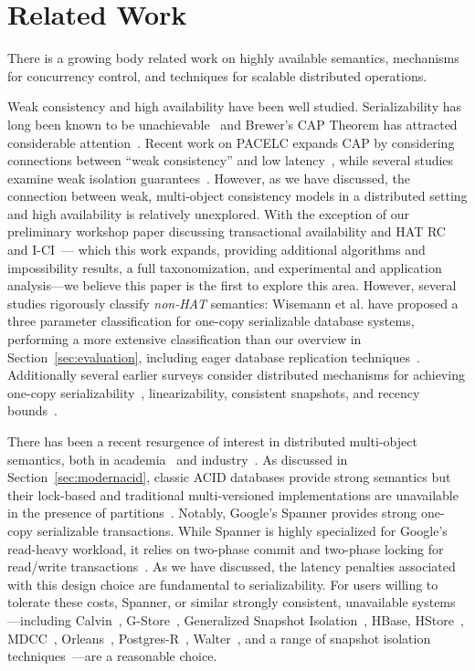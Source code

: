 
\section{Related Work}

There is a growing body related work on highly available semantics,
mechanisms for concurrency control, and techniques for scalable
distributed operations.

Weak consistency and high availability have been well
studied. Serializability has long been known to be
unachievable~\cite{davidson-survey} and Brewer's CAP Theorem has
attracted considerable attention~\cite{gilbert-cap}. Recent work on
PACELC expands CAP by considering connections between ``weak
consistency'' and low latency~\cite{abadi-pacelc}, while several
studies examine weak isolation guarantees~\cite{adya,
  ansicritique}. However, as we have discussed, the connection between
weak, multi-object consistency models in a distributed setting and
high availability is relatively unexplored. With the exception of our
preliminary workshop paper discussing transactional availability and
HAT RC and I-CI~\cite{hat-hotos}--- which this work expands, providing
additional algorithms and impossibility results, a full
taxonomization, and experimental and application analysis---we believe
this paper is the first to explore this area. However, several studies
rigorously classify \textit{non-HAT} semantics: Wisemann et al. have
proposed a three parameter classification for one-copy serializable
database systems, performing a more extensive classification than our
overview in Section~\ref{sec:evaluation}, including eager database
replication techniques~\cite{kemme-classification}. Additionally
several earlier surveys consider distributed mechanisms for achieving
one-copy serializability~\cite{wisemann-survey}, linearizability,
consistent snapshots, and recency bounds~\cite{ceri-mechanism,
  chen-mechanism}.

There has been a recent resurgence of interest in distributed
multi-object semantics, both in academia~\cite{kraska-s3, gstore,
  mdcc, eiger, walter,calvin, swift} and industry~\cite{orleans,
  spanner}. As discussed in Section~\ref{sec:modernacid}, classic ACID
databases provide strong semantics but their lock-based and
traditional multi-versioned implementations are unavailable in the
presence of partitions~\cite{bernstein-book, gray-isolation}. Notably,
Google's Spanner provides strong one-copy serializable
transactions. While Spanner is highly specialized for Google's
read-heavy workload, it relies on two-phase commit and two-phase
locking for read/write transactions~\cite{spanner}. As we have
discussed, the latency penalties associated with this design choice
are fundamental to serializability. For users willing to tolerate
these costs, Spanner, or similar strongly consistent, unavailable
systems---including Calvin~\cite{calvin}, G-Store~\cite{gstore},
Generalized Snapshot Isolation~\cite{generalizedsnapshot}, HBase,
HStore~\cite{hstore}, MDCC~\cite{mdcc}, Orleans~\cite{orleans},
Postgres-R~\cite{kemme-thesis}, Walter~\cite{walter}, and a range of
snapshot isolation techniques~\cite{middleware-db, kemme-snapshot,
  daudjee-snapshot}---are a reasonable choice.

